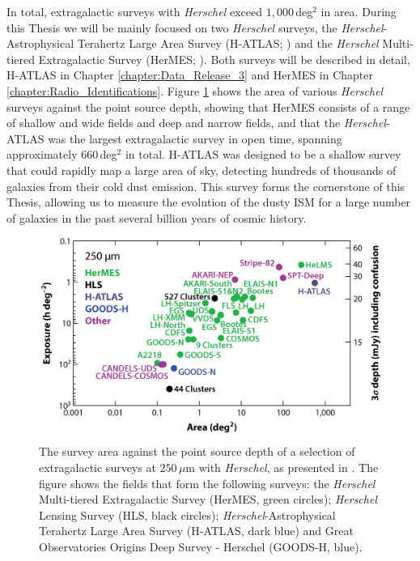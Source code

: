 In total, extragalactic surveys with \textit{Herschel} exceed $1,000\,$deg$^2$ in area. During this Thesis we will be mainly focused on two \textit{Herschel} surveys, the \textit{Herschel}-Astrophysical Terahertz Large Area Survey (H-ATLAS; \citealt{Eales_2010}) and the \textit{Herschel} Multi-tiered Extragalactic Survey (HerMES; \citealt{Oliver_2012}). Both surveys will be described in detail, H-ATLAS in Chapter \ref{chapter:Data_Release_3} and HerMES in Chapter \ref{chapter:Radio_Identifications}. Figure \ref{fig:herschel_surveys} shows the area of various \textit{Herschel} surveys against the point source depth, showing that HerMES consists of a range of shallow and wide fields and deep and narrow fields, and that the \textit{Herschel}-ATLAS was the largest extragalactic survey in open time, spanning approximately $660\,$deg$^2$ in total. H-ATLAS was designed to be a shallow survey that could rapidly map a large area of sky, detecting hundreds of thousands of galaxies from their cold dust emission. This survey forms the cornerstone of this Thesis, allowing us to measure the evolution of the dusty ISM for a large number of galaxies in the past several billion years of cosmic history.

\begin{figure}
    \centering
	\includegraphics[width=0.9\columnwidth]{Figures/herschel_surveys.pdf}
	\caption[Survey area against point source depth for extragalactic \textit{Herschel} surveys]{The survey area against the point source depth of a selection of extragalactic surveys at $250\,\mu$m with \textit{Herschel}, as presented in \citealt{Lutz_2014}. The figure shows the fields that form the following surveys: the \textit{Herschel} Multi-tiered Extragalactic Survey (HerMES, green circles); \textit{Herschel} Lensing Survey (HLS, black circles); \textit{Herschel}-Astrophysical Terahertz Large Area Survey (H-ATLAS, dark blue) and Great Observatories Origins Deep Survey - Herschel (GOODS-H, blue).}
	\label{fig:herschel_surveys}
\end{figure}

